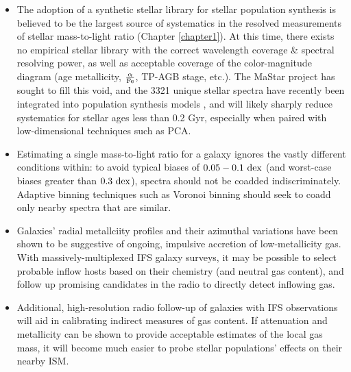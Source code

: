 \begin{itemize}
    \item The adoption of a synthetic stellar library for stellar population synthesis is believed to be the largest source of systematics in the resolved measurements of stellar mass-to-light ratio (Chapter \ref{chapter1}). At this time, there exists no empirical stellar library with the correct wavelength coverage \& spectral resolving power, as well as acceptable coverage of the color-magnitude diagram (age metallicity, $\frac{\rm \alpha}{\rm Fe}$, TP-AGB stage, etc.). The MaStar project \citep{yan_19_mastar} has sought to fill this void, and the 3321 unique stellar spectra have recently been integrated into population synthesis models \citep{maraston_20_mastar-models}, and will likely sharply reduce systematics for stellar ages less than 0.2 Gyr, especially when paired with low-dimensional techniques such as PCA.
    \item Estimating a single mass-to-light ratio for a galaxy ignores the vastly different conditions within: to avoid typical biases of $0.05 - 0.1 ~ {\rm dex}$ (and worst-case biases greater than $0.3 ~ {\rm dex}$), spectra should not be coadded indiscriminately. Adaptive binning techniques such as Voronoi binning should seek to coadd only nearby spectra that are similar.
    \item Galaxies' radial metallciity profiles and their azimuthal variations have been shown to be suggestive of ongoing, impulsive accretion of low-metallicity gas. With massively-multiplexed IFS galaxy surveys, it may be possible to select probable inflow hosts based on their chemistry (and neutral gas content), and follow up promising candidates in the radio to directly detect inflowing gas.
    \item Additional, high-resolution radio follow-up of galaxies with IFS observations will aid in calibrating indirect measures of gas content. If attenuation and metallicity can be shown to provide acceptable estimates of the local gas mass, it will become much easier to probe stellar populations' effects on their nearby ISM.
\end{itemize}